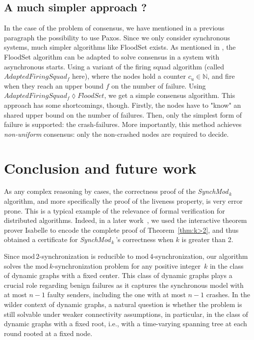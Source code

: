 \documentclass{article}
\newcommand{\SM}{{\em SynchMod}$_{\,k}\ $}
\begin{document}
\subsection{A much simpler approach ?}

In the case of the problem of consensus, we have mentioned in a previous paragraph the possibility to use Paxos.
Since we only consider synchronous systems, much simpler algorithms like FloodSet \cite{lynch_distributed} exists.
As mentioned in \cite{distributed_firing_squad}, the FloodSet algorithm can be adapted to solve consensus in a system with asynchronous starts.
Using a variant of the firing squad algorithm (called $AdaptedFiringSquad_f$ here),
where the nodes hold a counter $c_u \in \mathds{N}$, and fire when they reach an upper bound $f$ on the number of failure.
Using $AdaptedFiringSquad_f \lozenge FloodSet$, we get a simple consensus algorithm.
This approach has some shortcomings, though.
Firstly, the nodes have to "know" an shared upper bound on the number of failures.
Then, only the simplest form of failure is supported: the crash-failures.
More importantly, this method achieves \textit{non-uniform} consensus: only the non-crashed nodes are required to decide.

\section{Conclusion and future work}

As any complex reasoning by cases, the correctness proof  of the \SM   algorithm, 
	and more specifically the proof of the liveness property, is very error prone. 
This is a typical example of the relevance of formal verification for distributed algorithms. 
Indeed, in a later work~\cite{}, we used the interactive theorem prover Isabelle \cite{HO_isa} to encode the complete proof 
	of Theorem~\ref{thm:k>2}, and thus obtained a certificate for  \SM\!\!'s correctness when $k$ is greater than 2.
	
Since $\mathrm{mod}\,2$-synchronization is reducible to $\mathrm{mod}\,4$-synchronization,
	 our algorithm solves the $\mathrm{mod}\,k$-synchronization problem for any positive integer~$k$
	 in the class of  dynamic  graphs with a fixed center.
This class of dynamic graphs plays a crucial role regarding benign failures as it captures 
	the synchronous model with at most $n-1$ faulty senders, including the one with at most $n-1$ crashes.
In the wilder context of dynamic graphs, a natural question is whether the problem is still solvable 
	under weaker connectivity assumptions, in particular, in the class of dynamic graphs with a fixed root, 
	i.e., with a time-varying spanning tree at each round rooted at a fixed node.

\printbibliography
\end{document}
